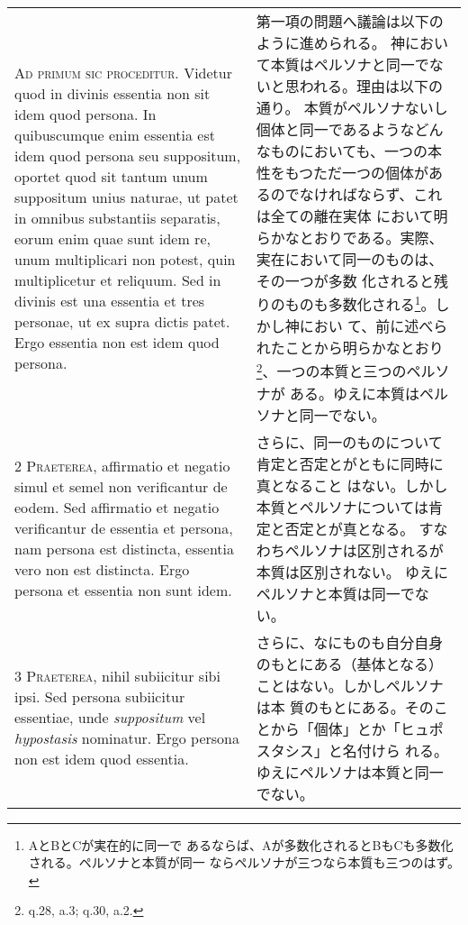 \documentclass[10pt]{jsarticle} %
\begin{document}
\begin{longtable}{p{21em}p{21em}}

{\Huge A}{\scshape d primum sic proceditur}. Videtur quod in divinis essentia non sit idem
quod persona. In quibuscumque enim essentia est idem quod persona seu
suppositum, oportet quod sit tantum unum suppositum unius naturae, ut
patet in omnibus substantiis separatis, eorum enim quae sunt idem re,
unum multiplicari non potest, quin multiplicetur et reliquum. Sed in
divinis est una essentia et tres personae, ut ex supra dictis
patet. Ergo essentia non est idem quod persona.


&

第一項の問題へ議論は以下のように進められる。
神において本質はペルソナと同一でないと思われる。理由は以下の通り。
本質がペルソナないし個体と同一であるようなどんなものにおいても、一つの本
 性をもつただ一つの個体があるのでなければならず、これは全ての離在実体
 において明らかなとおりである。実際、実在において同一のものは、その一つが多数
 化されると残りのものも多数化される\footnote{AとBとCが実在的に同一で
 あるならば、Aが多数化されるとBもCも多数化される。ペルソナと本質が同一
 ならペルソナが三つなら本質も三つのはず。}。しかし神におい
 て、前に述べられたことから明らかなとおり\footnote{q.28, a.3; q.30, a.2.}、一つの本質と三つのペルソナが
 ある。ゆえに本質はペルソナと同一でない。


\\



2 {\scshape Praeterea}, affirmatio et negatio simul et semel non verificantur de
eodem. Sed affirmatio et negatio verificantur de essentia et persona,
nam persona est distincta, essentia vero non est distincta. Ergo persona
et essentia non sunt idem.


&

さらに、同一のものについて肯定と否定とがともに同時に真となること
 はない。しかし本質とペルソナについては肯定と否定とが真となる。
すなわちペルソナは区別されるが本質は区別されない。
ゆえにペルソナと本質は同一でない。


\\



3 {\scshape Praeterea}, nihil subiicitur sibi ipsi. Sed persona subiicitur essentiae,
unde {\itshape suppositum} vel {\itshape hypostasis} nominatur. Ergo persona non est idem quod
essentia.


&

さらに、なにものも自分自身のもとにある（基体となる）ことはない。しかしペルソナは本
 質のもとにある。そのことから「個体」とか「ヒュポスタシス」と名付けら
 れる。ゆえにペルソナは本質と同一でない。


\end{longtable}
\end{document}
